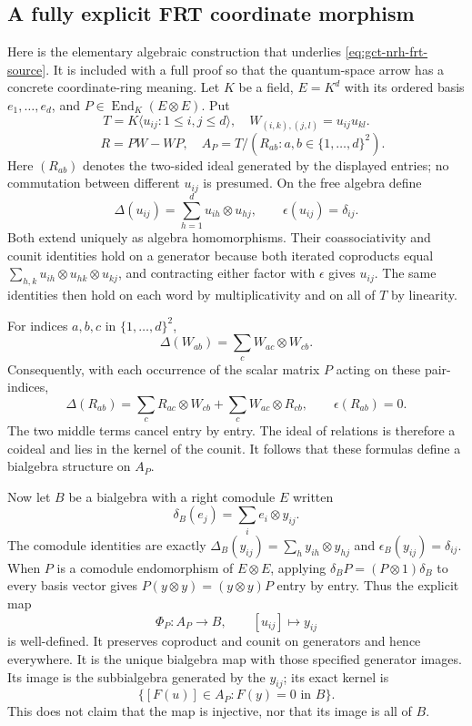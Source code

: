 \subsection{A fully explicit FRT coordinate morphism}

Here is the elementary algebraic construction that underlies
\eqref{eq:gct-nrh-frt-source}.  It is included with a full proof so that
the quantum-space arrow has a concrete coordinate-ring meaning.
Let $K$ be a field, $E=K^d$ with its ordered basis $e_1,\ldots,e_d$, and
$P\in\operatorname{End}_K(E\otimes E)$.  Put
\[
 T=K\langle u_{ij}:1\le i,j\le d\rangle,
 \quad W_{(i,k),(j,l)}=u_{ij}u_{kl}.
\]
\[
 \quad R=PW-WP,
 \quad A_P=T/(R_{ab}:a,b\in\{1,\ldots,d\}^2).
\]
Here $(R_{ab})$ denotes the two-sided ideal generated by the displayed
entries; no commutation between different $u_{ij}$ is presumed.
On the free algebra define
\[
 \Delta(u_{ij})=\sum_{h=1}^{d}u_{ih}\otimes u_{hj},
 \qquad \epsilon(u_{ij})=\delta_{ij}.
\]
Both extend uniquely as algebra homomorphisms.  Their coassociativity
and counit identities hold on a generator because both iterated
coproducts equal
$\sum_{h,k}u_{ih}\otimes u_{hk}\otimes u_{kj}$, and contracting either
factor with $\epsilon$ gives $u_{ij}$.  The same identities then hold on
each word by multiplicativity and on all of $T$ by linearity.

For indices $a,b,c$ in $\{1,\ldots,d\}^2$,
\[
 \Delta(W_{ab})=\sum_c W_{ac}\otimes W_{cb}.
\]
Consequently, with each occurrence of the scalar matrix $P$ acting on
these pair-indices,
\[
 \Delta(R_{ab})
 =\sum_c R_{ac}\otimes W_{cb}
       +\sum_c W_{ac}\otimes R_{cb},
 \qquad \epsilon(R_{ab})=0.
\]
The two middle terms cancel entry by entry.  The ideal of relations is
therefore a coideal and lies in the kernel of the counit.  It follows
that these formulas define a bialgebra structure on $A_P$.

Now let $B$ be a bialgebra with a right comodule $E$ written
\[
 \delta_B(e_j)=\sum_i e_i\otimes y_{ij}.
\]
The comodule identities are exactly
$\Delta_B(y_{ij})=\sum_h y_{ih}\otimes y_{hj}$ and
$\epsilon_B(y_{ij})=\delta_{ij}$.  When $P$ is a comodule endomorphism
of $E\otimes E$, applying $\delta_B P=(P\otimes1)\delta_B$ to every
basis vector gives
$P(y\otimes y)=(y\otimes y)P$ entry by entry.  Thus the explicit map
\begin{equation}\label{eq:gct-nrh-universal-map}
 \Phi_P:A_P\longrightarrow B,\qquad
       [u_{ij}]\longmapsto y_{ij}
\end{equation}
is well-defined.  It preserves coproduct and counit on generators and
hence everywhere.  It is the unique bialgebra map with those specified
generator images.  Its image is the subbialgebra generated by the
$y_{ij}$; its exact kernel is
\[
 \{[F(u)]\in A_P:F(y)=0\text{ in }B\}.
\]
This does not claim that the map is injective, nor that its image is all
of $B$.

